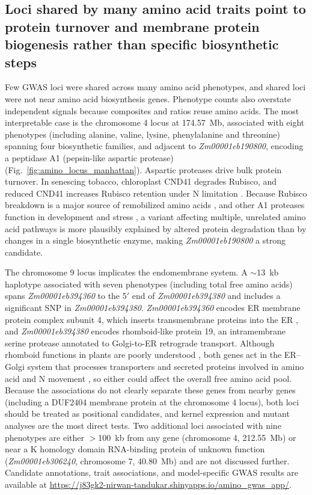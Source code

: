 \subsection{Loci shared by many amino acid traits point to protein turnover and membrane protein biogenesis rather than specific biosynthetic steps}

Few GWAS loci were shared across many amino acid phenotypes, and shared loci were not near amino acid biosynthesis genes. Phenotype counts also overstate independent signals because composites and ratios reuse amino acids. The most interpretable case is the chromosome 4 locus at 174.57~Mb, associated with eight phenotypes (including alanine, valine, lysine, phenylalanine and threonine) spanning four biosynthetic families, and adjacent to \textit{Zm00001eb190800}, encoding a peptidase A1 (pepsin-like aspartic protease) (Fig.~\ref{fig:amino_locus_manhattan}). Aspartic proteases drive bulk protein turnover. In senescing tobacco, chloroplast CND41 degrades Rubisco, and reduced CND41 increases Rubisco retention under N limitation \citep{Kato2004CND41}. Because Rubisco breakdown is a major source of remobilized amino acids \citep{Feller2008Rubiscolytics}, and other A1 proteases function in development and stress \citep{Soares2019AtypicalAP}, a variant affecting multiple, unrelated amino acid pathways is more plausibly explained by altered protein degradation than by changes in a single biosynthetic enzyme, making \textit{Zm00001eb190800} a strong candidate.

The chromosome 9 locus implicates the endomembrane system. A $\sim$13~kb haplotype associated with seven phenotypes (including total free amino acids) spans \textit{Zm00001eb394360} to the 5$'$ end of \textit{Zm00001eb394380} and includes a significant SNP in \textit{Zm00001eb394380}. \textit{Zm00001eb394360} encodes ER membrane protein complex subunit 4, which inserts transmembrane proteins into the ER \citep{Guna2018EMC}, and \textit{Zm00001eb394380} encodes rhomboid-like protein 19, an intramembrane serine protease annotated to Golgi-to-ER retrograde transport. Although rhomboid functions in plants are poorly understood \citep{KnopfAdam2012Rhomboid}, both genes act in the ER--Golgi system that processes transporters and secreted proteins involved in amino acid and N movement \citep{Brandizzi2018ERGolgi}, so either could affect the overall free amino acid pool. Because the associations do not clearly separate these genes from nearby genes (including a DUF2404 membrane protein at the chromosome 4 locus), both loci should be treated as positional candidates, and kernel expression and mutant analyses are the most direct tests. Two additional loci associated with nine phenotypes are either $>$100~kb from any gene (chromosome 4, 212.55~Mb) or near a K homology domain RNA-binding protein of unknown function (\textit{Zm00001eb306240}, chromosome 7, 40.80~Mb) and are not discussed further. Candidate annotations, trait associations, and model-specific GWAS results are available at \url{https://j83gk2-nirwan-tandukar.shinyapps.io/amino_gwas_app/}.


